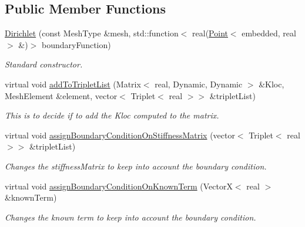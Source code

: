 \subsection*{Public Member Functions}
\begin{DoxyCompactItemize}
\item 
\hyperlink{class_dirichlet_af94781839af8702da778a451157b8b58}{Dirichlet} (const Mesh\+Type \&mesh, std\+::function$<$ real(\hyperlink{class_point}{Point}$<$ embedded, real $>$ \&)$>$ boundary\+Function)\hypertarget{class_dirichlet_af94781839af8702da778a451157b8b58}{}\label{class_dirichlet_af94781839af8702da778a451157b8b58}

\begin{DoxyCompactList}\small\item\em Standard constructor. \end{DoxyCompactList}\item 
virtual void \hyperlink{class_dirichlet_a8fc4c08f205989873d3c0a7fcd82cfa4}{add\+To\+Triplet\+List} (Matrix$<$ real, Dynamic, Dynamic $>$ \&Kloc, Mesh\+Element \&element, vector$<$ Triplet$<$ real $>$$>$ \&triplet\+List)
\begin{DoxyCompactList}\small\item\em This is to decide if to add the Kloc computed to the matrix. \end{DoxyCompactList}\item 
virtual void \hyperlink{class_dirichlet_ade7dd97b00bf71bbed49e52954f7df96}{assign\+Boundary\+Condition\+On\+Stiffness\+Matrix} (vector$<$ Triplet$<$ real $>$$>$ \&triplet\+List)\hypertarget{class_dirichlet_ade7dd97b00bf71bbed49e52954f7df96}{}\label{class_dirichlet_ade7dd97b00bf71bbed49e52954f7df96}

\begin{DoxyCompactList}\small\item\em Changes the stiffness\+Matrix to keep into account the boundary condition. \end{DoxyCompactList}\item 
virtual void \hyperlink{class_dirichlet_ac10baf3c4fa3e987a2e194899f9c4d39}{assign\+Boundary\+Condition\+On\+Known\+Term} (VectorX$<$ real $>$ \&known\+Term)\hypertarget{class_dirichlet_ac10baf3c4fa3e987a2e194899f9c4d39}{}\label{class_dirichlet_ac10baf3c4fa3e987a2e194899f9c4d39}

\begin{DoxyCompactList}\small\item\em Changes the known term to keep into account the boundary condition. \end{DoxyCompactList}\end{DoxyCompactItemize}
